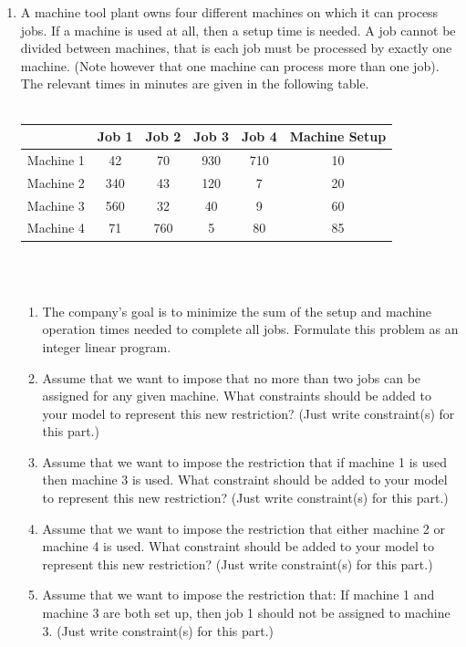 \documentclass{article}
\begin{document}
\begin{enumerate}
\item A machine tool plant owns four different machines on which it can process jobs. If a machine is used at all, then a setup time is needed. A job cannot be divided between machines, that is each job must be processed by exactly one machine. (Note however that one machine can process more than one job). The relevant times in minutes are given in the following table.\\\\
\begin{tabular}{|c|c|c|c|c|c|}
  \hline
         & Job 1 & Job 2 & Job 3 & Job 4 & Machine Setup \\
\hline
  Machine 1 & 42 & 70 & 930 & 710 & 10 \\
  \hline
  Machine 2 & 340 & 43 & 120 & 7 & 20 \\
  \hline
  Machine 3 & 560 & 32 & 40 & 9 & 60 \\
  \hline
  Machine 4 & 71 & 760 & 5 & 80 & 85 \\
  \hline
\end{tabular}\\\\
\begin{enumerate}
\item  The company's goal is to minimize the sum of the setup and machine operation times needed to complete all jobs. Formulate this problem as an integer linear program.

\item Assume that we want to impose that no more than two jobs can be assigned for any given machine. What constraints should be added to your model to represent this new restriction? (Just write constraint(s) for this part.)

\item Assume that we want to impose the restriction that if machine 1 is used then machine 3 is used. What constraint should be added to your model to represent this new restriction? (Just write constraint(s) for this part.)

\item Assume that we want to impose the restriction that either machine 2 or machine 4 is used. What constraint should be added to your model to represent this new restriction? (Just write constraint(s) for this part.)

\item Assume that we want to impose the restriction that: If machine 1 and machine 3 are both set up, then job 1 should not be assigned to machine 3. (Just write constraint(s) for this part.)
\end{enumerate}


\end{enumerate}
\end{document}
